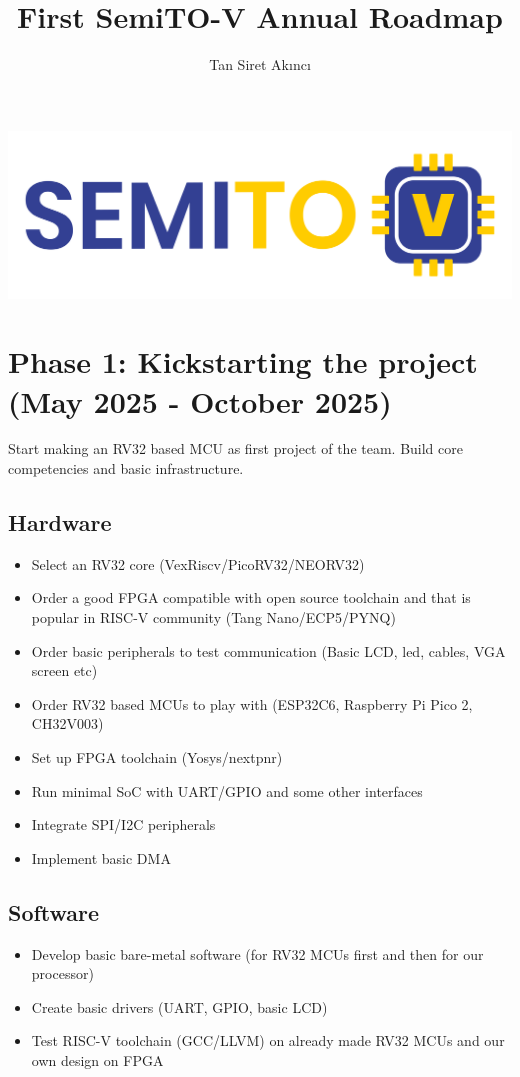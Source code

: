 \documentclass{article}
\title{First SemiTO-V Annual Roadmap}
\author{Tan Siret Akıncı}
\date
\begin{document}
\maketitle
\begin{center}
    \includegraphics[scale=0.7]{semito-v_logo.png}
\end{center}

\section{Phase 1: Kickstarting the project (May 2025 - October 2025)}
Start making an RV32 based MCU as first project of the team. Build core competencies and basic infrastructure.

\subsection{Hardware}
\begin{itemize}
    \item Select an RV32 core (VexRiscv/PicoRV32/NEORV32)
    \item Order a good FPGA compatible with open source toolchain and that is popular in RISC-V community (Tang Nano/ECP5/PYNQ)
    \item Order basic peripherals to test communication (Basic LCD, led, cables, VGA screen etc)
    \item Order RV32 based MCUs to play with (ESP32C6, Raspberry Pi Pico 2, CH32V003)
    \item Set up FPGA toolchain (Yosys/nextpnr)
    \item Run minimal SoC with UART/GPIO and some other interfaces
    \item Integrate SPI/I2C peripherals
    \item Implement basic DMA
\end{itemize}

\subsection{Software}
\begin{itemize}
    \item Develop basic bare-metal software (for RV32 MCUs first and then for our processor)
    \item Create basic drivers (UART, GPIO, basic LCD)
    \item Test RISC-V toolchain (GCC/LLVM) on already made RV32 MCUs and our own design on FPGA
\end{itemize}
\end{document}
